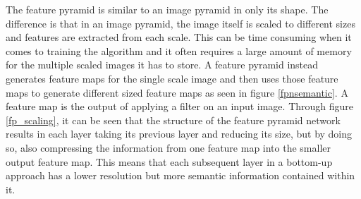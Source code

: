 \documentclass{l4proj}
\begin{document}
The feature pyramid is similar to an image pyramid in only its shape. The difference is that in an image pyramid, the image itself is scaled to different sizes and features are extracted from each scale. This can be time consuming when it comes to training the algorithm and it often requires a large amount of memory for the multiple scaled images it has to store. A feature pyramid instead generates feature maps for the single scale image and then uses those feature maps to generate different sized feature maps as seen in figure \ref{fpnsemantic}. A feature map is the output of applying a filter on an input image. Through figure \ref{fp_scaling}, it can be seen that the structure of the feature pyramid network results in each layer taking its previous layer and reducing its size, but by doing so, also compressing the information from one feature map into the smaller output feature map. This means that each subsequent layer in a bottom-up approach has a lower resolution but more semantic information contained within it.
\end{document}
